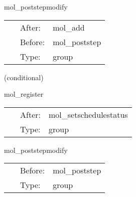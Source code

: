 
\hspace{5mm} mol\_poststepmodify 

\hspace{5mm}{\it the group for physics thorns to schedule enforcing constraints } 


\hspace{5mm}

 \begin{tabular*}{160mm}{cll} 
~ & After:  & mol\_add \\ 
~ & Before:  & mol\_poststep \\ 
~ & Type:  & group \\ 
\end{tabular*} 


\vspace{5mm}

   (conditional) 

\hspace{5mm} mol\_register 

\hspace{5mm}{\it the group where physics thorns register variables with mol } 


\hspace{5mm}

 \begin{tabular*}{160mm}{cll} 
~ & After:  & mol\_setschedulestatus \\ 
~ & Type:  & group \\ 
\end{tabular*} 


\vspace{5mm}


\hspace{5mm} mol\_poststepmodify 

\hspace{5mm}{\it the group for physics thorns to schedule enforcing constraints } 


\hspace{5mm}

 \begin{tabular*}{160mm}{cll} 
~ & Before:  & mol\_poststep \\ 
~ & Type:  & group \\ 
\end{tabular*} 


\vspace{5mm}

